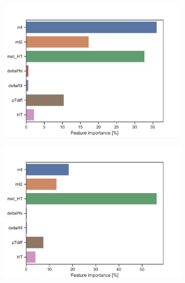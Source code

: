 \begin{figure}[H]
\begin{subfigure}[t!]{0.49\textwidth}
        \includegraphics[width = \textwidth]{Figures/WW/BDT/High_level/High/featureImportance.pdf}
        \caption{}
        \label{fig:featWWLow}
    \end{subfigure}
    \begin{subfigure}[t!]{0.49\textwidth}
        \includegraphics[width = \textwidth]{Figures/Mono_Z/ML/BDT/High_level/High/featureImportance.pdf}
        \caption{}
        \label{fig:featMonoZLow}
    \end{subfigure}
    \caption{}
    \label{fig:Non}
\end{figure}

